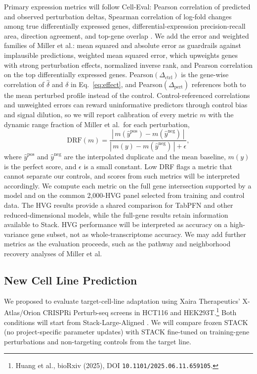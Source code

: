 \documentclass[times, twoside, watermark]{zHenriquesLab-StyleBioRxiv}
\begin{document}
Primary expression metrics will follow Cell-Eval: Pearson correlation of predicted and observed perturbation deltas, Spearman correlation of log-fold changes among true differentially expressed genes, differential-expression precision-recall area, direction agreement, and top-gene overlap \cite{dong2026stack}. We add the error and weighted families of Miller et al.: mean squared and absolute error as guardrails against implausible predictions, weighted mean squared error, which upweights genes with strong perturbation effects, normalized inverse rank, and Pearson correlation on the top differentially expressed genes. Pearson$(\Delta_{\mathrm{ctrl}})$ is the gene-wise correlation of $\hat{\delta}$ and $\delta$ in Eq.~\eqref{eq:effect}, and Pearson$(\Delta_{\mathrm{pert}})$ references both to the mean perturbed profile instead of the control. Control-referenced correlations and unweighted errors can reward uninformative predictors through control bias and signal dilution, so we will report calibration of every metric $m$ with the dynamic range fraction of Miller et al.\ for each perturbation,
\begin{equation}
\mathrm{DRF}(m) = \frac{\left|\,m(\hat{y}^{\mathrm{pos}}) - m(\hat{y}^{\mathrm{neg}})\,\right|}{\left|\,m(y) - m(\hat{y}^{\mathrm{neg}})\,\right| + \epsilon},
\end{equation}
where $\hat{y}^{\mathrm{pos}}$ and $\hat{y}^{\mathrm{neg}}$ are the interpolated duplicate and the mean baseline, $m(y)$ is the perfect score, and $\epsilon$ is a small constant. Low DRF flags a metric that cannot separate our controls, and scores from such metrics will be interpreted accordingly. We compute each metric on the full gene intersection supported by a model and on the common 2,000-HVG panel selected from training and control data. The HVG results provide a shared comparison for TabPFN and other reduced-dimensional models, while the full-gene results retain information available to Stack. HVG performance will be interpreted as accuracy on a high-variance gene subset, not as whole-transcriptome accuracy. We may add further metrics as the evaluation proceeds, such as the pathway and neighborhood recovery analyses of Miller et al.

\subsection*{New Cell Line Prediction}

We proposed to evaluate target-cell-line adaptation using Xaira Therapeutics' X-Atlas/Orion CRISPRi Perturb-seq screens in HCT116 and HEK293T.\footnote{Huang et al., bioRxiv (2025), DOI \texttt{10.1101/2025.06.11.659105}.} Both conditions will start from Stack-Large-Aligned \cite{dong2026stack}. We will compare frozen STACK (no project-specific parameter updates) with STACK fine-tuned on training-gene perturbations and non-targeting controls from the target line.
\end{document}
